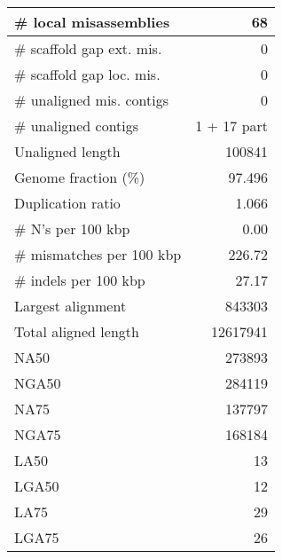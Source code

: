 \documentclass[12pt,a4paper]{article}
\begin{document}
\begin{table}[ht]
\begin{center}
\begin{tabular}{|l*{1}{|r}|}
\# local misassemblies & 68 \\ \hline
\# scaffold gap ext. mis. & 0 \\ \hline
\# scaffold gap loc. mis. & 0 \\ \hline
\# unaligned mis. contigs & 0 \\ \hline
\# unaligned contigs & 1 + 17 part \\ \hline
Unaligned length & 100841 \\ \hline
Genome fraction (\%) & 97.496 \\ \hline
Duplication ratio & 1.066 \\ \hline
\# N's per 100 kbp & 0.00 \\ \hline
\# mismatches per 100 kbp & 226.72 \\ \hline
\# indels per 100 kbp & 27.17 \\ \hline
Largest alignment & 843303 \\ \hline
Total aligned length & 12617941 \\ \hline
NA50 & 273893 \\ \hline
NGA50 & 284119 \\ \hline
NA75 & 137797 \\ \hline
NGA75 & 168184 \\ \hline
LA50 & 13 \\ \hline
LGA50 & 12 \\ \hline
LA75 & 29 \\ \hline
LGA75 & 26 \\ \hline
\end{tabular}
\end{center}
\end{table}
\end{document}

